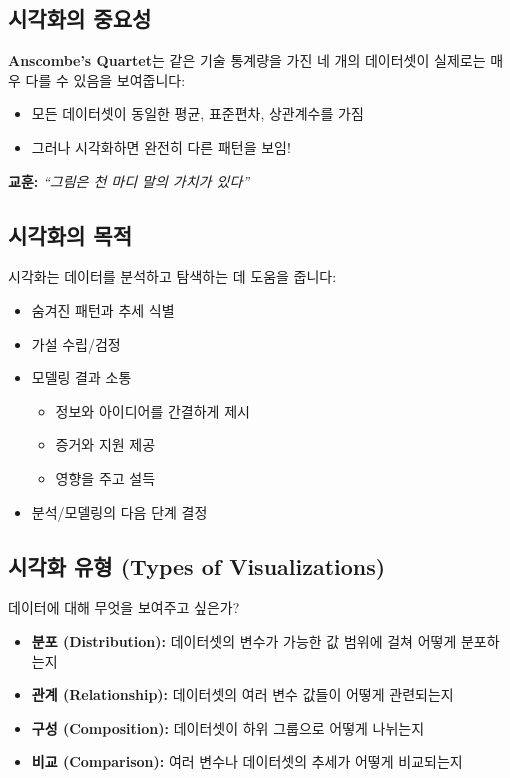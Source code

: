\documentclass[12pt,a4paper]{article}
\begin{document}
\subsection{시각화의 중요성}

\textbf{Anscombe's Quartet}는 같은 기술 통계량을 가진 네 개의 데이터셋이 실제로는 매우 다를 수 있음을 보여줍니다:

\begin{itemize}
    \item 모든 데이터셋이 동일한 평균, 표준편차, 상관계수를 가짐
    \item 그러나 시각화하면 완전히 다른 패턴을 보임!
\end{itemize}

\textbf{교훈:} \textit{``그림은 천 마디 말의 가치가 있다''}

\subsection{시각화의 목적}

시각화는 데이터를 분석하고 탐색하는 데 도움을 줍니다:

\begin{itemize}
    \item 숨겨진 패턴과 추세 식별
    \item 가설 수립/검정
    \item 모델링 결과 소통
    \begin{itemize}
        \item 정보와 아이디어를 간결하게 제시
        \item 증거와 지원 제공
        \item 영향을 주고 설득
    \end{itemize}
    \item 분석/모델링의 다음 단계 결정
\end{itemize}

\subsection{시각화 유형 (Types of Visualizations)}

데이터에 대해 무엇을 보여주고 싶은가?

\begin{itemize}
    \item \textbf{분포 (Distribution):} 데이터셋의 변수가 가능한 값 범위에 걸쳐 어떻게 분포하는지
    \item \textbf{관계 (Relationship):} 데이터셋의 여러 변수 값들이 어떻게 관련되는지
    \item \textbf{구성 (Composition):} 데이터셋이 하위 그룹으로 어떻게 나뉘는지
    \item \textbf{비교 (Comparison):} 여러 변수나 데이터셋의 추세가 어떻게 비교되는지
\end{itemize}
\end{document}
